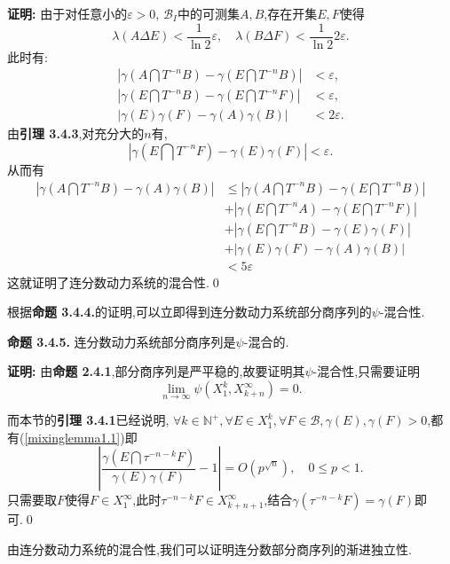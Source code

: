\textbf{证明:  }
由于对任意小的$\varepsilon>0$, $\mathcal{B}_I$中的可测集$A,B$,存在开集$E,F$使得$$\lambda(A\Delta E)<\frac{1}{\ln 2}\varepsilon,\quad \lambda(B\Delta F)<\frac{1}{\ln 2}2\varepsilon.$$
此时有:
\begin{align*}
    |\gamma(A\bigcap T^{-n}B)-\gamma(E\bigcap T^{-n}B)| & <\varepsilon,  \\
    |\gamma(E\bigcap T^{-n}B)-\gamma(E\bigcap T^{-n}F)| & <\varepsilon,  \\
    |\gamma(E)\gamma(F)-\gamma(A)\gamma(B)|             & <2\varepsilon.
\end{align*}
由\textbf{引理 3.4.3},对充分大的$n$有,
$$|\gamma(E\bigcap T^{-n}F)-\gamma(E)\gamma(F)|<\varepsilon.$$
从而有
\begin{align*}
    |\gamma(A\bigcap T^{-n}B)-\gamma(A)\gamma(B)| & \leqslant|\gamma(A\bigcap T^{-n}B)-\gamma(E\bigcap T^{-n}B)| \\
                                                  & +|\gamma(E\bigcap T^{-n}A)-\gamma(E\bigcap T^{-n}F)|         \\
                                                  & +|\gamma(E\bigcap T^{-n}B)-\gamma(E)\gamma(F)|               \\
                                                  & +|\gamma(E)\gamma(F)-\gamma(A)\gamma(B)|                     \\
                                                  & <5\varepsilon
\end{align*}
这就证明了连分数动力系统的混合性.\qed
\par
根据\textbf{命题 3.4.4.}的证明,可以立即得到连分数动力系统部分商序列的$\psi$-混合性.\par
\textbf{命题 3.4.5.  }\textsuperscript{\cite{Partial_quotients,Mixing}}
连分数动力系统部分商序列是$\psi$-混合的.
\par
\textbf{证明:  }
由\textbf{命题 2.4.1},部分商序列是严平稳的,故要证明其$\psi$-混合性,只需要证明
$$\lim_{n\to\infty}\psi(X_{1}^{k},X_{k+n}^{\infty})=0.$$\par
而本节的\textbf{引理 3.4.1}已经说明, $\forall k\in\mathbb{N^+},\forall E\in X_{1}^{k},\forall F\in \mathcal{B},\gamma(E),\gamma(F)>0$,都有(\ref{mixinglemma1.1})即
$$\left|\frac{\gamma(E\bigcap \tau^{-n-k}F)}{\gamma(E)\gamma(F)}-1\right|=O(p^{\sqrt{n}}),\quad 0\leqslant p<1.$$
只需要取$F$使得$F\in X_{1}^{\infty}$,此时$\tau^{-n-k}F\in X_{k+n+1}^{\infty}$,结合$\gamma(\tau^{-n-k}F)=\gamma(F)$即可.\qed
\par
由连分数动力系统的混合性,我们可以证明连分数部分商序列的渐进独立性.\par
